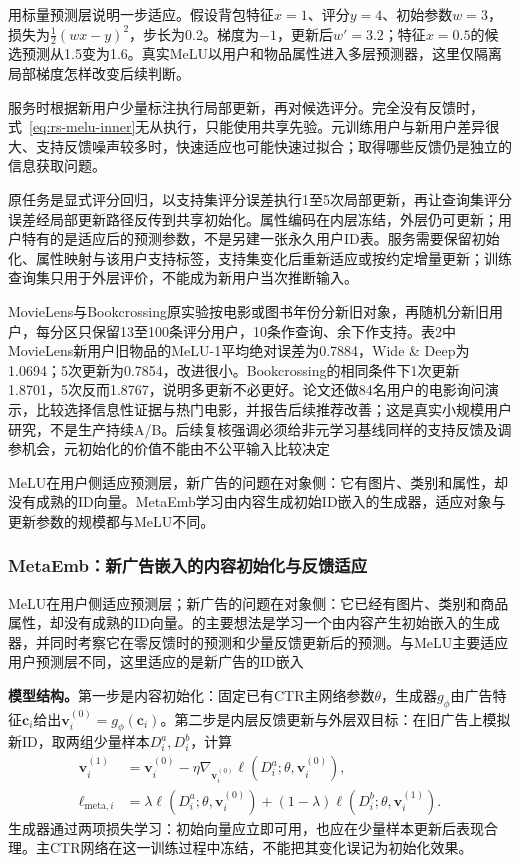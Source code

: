 用标量预测层说明一步适应。假设背包特征$x=1$、评分$y=4$、初始参数$w=3$，损失为$\tfrac12(wx-y)^2$，步长为0.2。梯度为$-1$，更新后$w'=3.2$；特征$x=0.5$的候选预测从1.5变为1.6。真实MeLU以用户和物品属性进入多层预测器，这里仅隔离局部梯度怎样改变后续判断。

服务时根据新用户少量标注执行局部更新，再对候选评分。完全没有反馈时，式~\eqref{eq:rs-melu-inner}无从执行，只能使用共享先验。元训练用户与新用户差异很大、支持反馈噪声较多时，快速适应也可能快速过拟合；取得哪些反馈仍是独立的信息获取问题。

原任务是显式评分回归，以支持集评分误差执行1至5次局部更新，再让查询集评分误差经局部更新路径反传到共享初始化。属性编码在内层冻结，外层仍可更新；用户特有的是适应后的预测参数，不是另建一张永久用户ID表。服务需要保留初始化、属性映射与该用户支持标签，支持集变化后重新适应或按约定增量更新；训练查询集只用于外层评价，不能成为新用户当次推断输入。

MovieLens与Bookcrossing原实验按电影或图书年份分新旧对象，再随机分新旧用户，每分区只保留13至100条评分用户，10条作查询、余下作支持。表2中MovieLens新用户旧物品的MeLU-1平均绝对误差为0.7884，Wide \& Deep为1.0694；5次更新为0.7854，改进很小。Bookcrossing的相同条件下1次更新1.8701，5次反而1.8767，说明多更新不必更好。论文还做84名用户的电影询问演示，比较选择信息性证据与热门电影，并报告后续推荐改善；这是真实小规模用户研究，不是生产持续A/B。后续复核强调必须给非元学习基线同样的支持反馈及调参机会，元初始化的价值不能由不公平输入比较决定

MeLU在用户侧适应预测层，新广告的问题在对象侧：它有图片、类别和属性，却没有成熟的ID向量。MetaEmb学习由内容生成初始ID嵌入的生成器，适应对象与更新参数的规模都与MeLU不同。

\subsubsection{MetaEmb：新广告嵌入的内容初始化与反馈适应}
\label{sec:rs-metaemb}

MeLU在用户侧适应预测层；新广告的问题在对象侧：它已经有图片、类别和商品属性，却没有成熟的ID向量。的主要想法是学习一个由内容产生初始嵌入的生成器，并同时考察它在零反馈时的预测和少量反馈更新后的预测。与MeLU主要适应用户预测层不同，这里适应的是新广告的ID嵌入

\textbf{模型结构。}第一步是内容初始化：固定已有CTR主网络参数$\theta$，生成器$g_\phi$由广告特征$\bm{c}_i$给出$\bm{v}^{(0)}_i=g_\phi(\bm{c}_i)$。第二步是内层反馈更新与外层双目标：在旧广告上模拟新ID，取两组少量样本$D_i^a,D_i^b$，计算
\begin{align}
  \bm{v}^{(1)}_i&=\bm{v}^{(0)}_i
      -\eta\nabla_{\bm{v}^{(0)}_i}\ell(D_i^a;\theta,\bm{v}^{(0)}_i),\\
  \ell_{\mathrm{meta},i}&=
     \lambda\ell(D_i^a;\theta,\bm{v}^{(0)}_i)
      +(1-\lambda)\ell(D_i^b;\theta,\bm{v}^{(1)}_i).
  \label{eq:rs-metaemb}
\end{align}
生成器通过两项损失学习：初始向量应立即可用，也应在少量样本更新后表现合理。主CTR网络在这一训练过程中冻结，不能把其变化误记为初始化效果。

